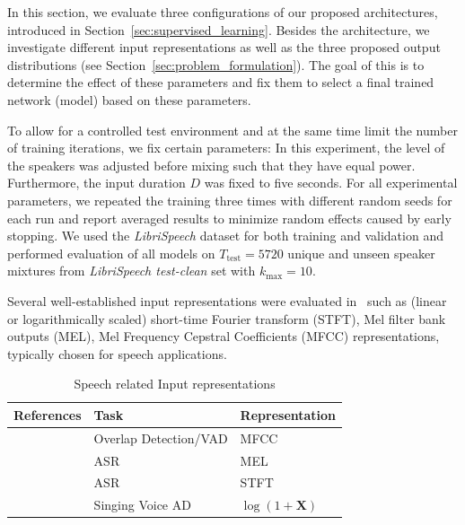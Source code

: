 In this section, we evaluate three configurations of our proposed architectures, introduced in Section~\ref{sec:supervised_learning}.
Besides the architecture, we investigate different input representations as well as the three proposed output distributions (see Section~\ref{sec:problem_formulation}).
The goal of this is to determine the effect of these parameters and fix them to select a final trained network (model) based on these parameters.
\par
To allow for a controlled test environment and at the same time limit the number of training iterations, we fix certain parameters:
In this experiment, the level of the speakers was adjusted before mixing such that they have equal power.\@
Furthermore, the input duration \(D\) was fixed to five seconds.
For all experimental parameters, we repeated the training three times with different random seeds for each run and report averaged results to minimize random effects caused by early stopping.
We used the \emph{LibriSpeech} dataset for both training and validation and
performed evaluation of all models on \(T_{\textrm{test}} = 5720\) unique and unseen speaker mixtures from \emph{LibriSpeech test-clean} set with \(k_{\max} = 10\).
\par
Several well-established input representations were evaluated in~\cite{stoeter17} such as (linear or logarithmically scaled) short-time Fourier transform (STFT), Mel filter bank outputs (MEL), Mel Frequency Cepstral Coefficients (MFCC) representations, typically chosen for speech applications.

\begin{table}
\caption{Speech related Input representations}
\label{tab:inputrep}
  \centering
\begin{tabular}{rll}
\toprule
References & Task & Representation \\
\midrule
\cite{geiger13, hagerer17} & Overlap Detection/VAD & MFCC \\
\cite{Graves13, sainath15, marchi17} & ASR & MEL \\
\cite{amodei16} & ASR & STFT \\
\cite{schluter15, schluter16} & Singing Voice AD & \(\log(1 + \mathbf{X})\) \\
\bottomrule
\end{tabular}
\end{table}

